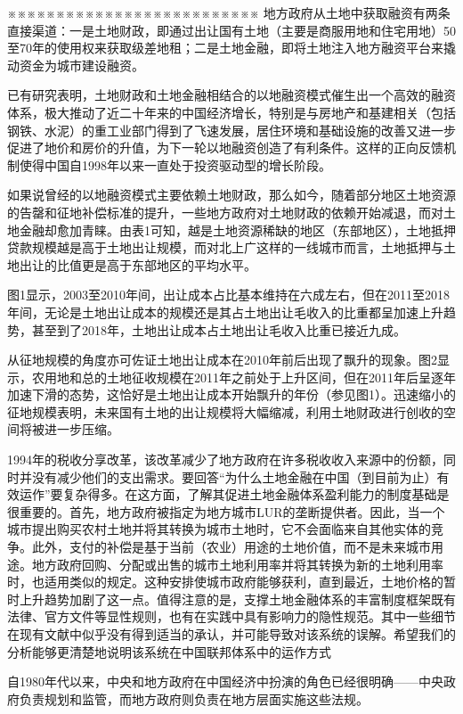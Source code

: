 ※※※※※※※※※※※※※※※※※※※※※※※※※※
地方政府从土地中获取融资有两条直接渠道：一是土地财政，即通过出让国有土地（主要是商服用地和住宅用地）50至70年的使用权来获取级差地租；二是土地金融，即将土地注入地方融资平台来撬动资金为城市建设融资。

已有研究表明，土地财政和土地金融相结合的以地融资模式催生出一个高效的融资体系，极大推动了近二十年来的中国经济增长，特别是与房地产和基建相关（包括钢铁、水泥）的重工业部门得到了飞速发展，居住环境和基础设施的改善又进一步促进了地价和房价的升值，为下一轮以地融资创造了有利条件。这样的正向反馈机制使得中国自1998年以来一直处于投资驱动型的增长阶段。

如果说曾经的以地融资模式主要依赖土地财政，那么如今，随着部分地区土地资源的告罄和征地补偿标准的提升，一些地方政府对土地财政的依赖开始减退，而对土地金融却愈加青睐。由表1可知，越是土地资源稀缺的地区（东部地区），土地抵押贷款规模越是高于土地出让规模，而对北上广这样的一线城市而言，土地抵押与土地出让的比值更是高于东部地区的平均水平。

图1显示，2003至2010年间，出让成本占比基本维持在六成左右，但在2011至2018年间，无论是土地出让成本的规模还是其占土地出让毛收入的比重都呈加速上升趋势，甚至到了2018年，土地出让成本占土地出让毛收入比重已接近九成。

从征地规模的角度亦可佐证土地出让成本在2010年前后出现了飘升的现象。图2显示，农用地和总的土地征收规模在2011年之前处于上升区间，但在2011年后呈逐年加速下滑的态势，这恰好是土地出让成本开始飘升的年份（参见图1）。迅速缩小的征地规模表明，未来国有土地的出让规模将大幅缩减，利用土地财政进行创收的空间将被进一步压缩。

1994年的税收分享改革，该改革减少了地方政府在许多税收收入来源中的份额，同时并没有减少他们的支出需求。要回答“为什么土地金融在中国（到目前为止）有效运作”要复杂得多。在这方面，了解其促进土地金融体系盈利能力的制度基础是很重要的。首先，地方政府被指定为地方城市LUR的垄断提供者。因此，当一个城市提出购买农村土地并将其转换为城市土地时，它不会面临来自其他实体的竞争。此外，支付的补偿是基于当前（农业）用途的土地价值，而不是未来城市用途。地方政府回购、分配或出售的城市土地利用率并将其转换为新的土地利用率时，也适用类似的规定。这种安排使城市政府能够获利，直到最近，土地价格的暂时上升趋势加剧了这一点。值得注意的是，支撑土地金融体系的丰富制度框架既有法律、官方文件等显性规则，也有在实践中具有影响力的隐性规范。其中一些细节在现有文献中似乎没有得到适当的承认，并可能导致对该系统的误解。希望我们的分析能够更清楚地说明该系统在中国联邦体系中的运作方式

自1980年代以来，中央和地方政府在中国经济中扮演的角色已经很明确——中央政府负责规划和监管，而地方政府则负责在地方层面实施这些法规。

